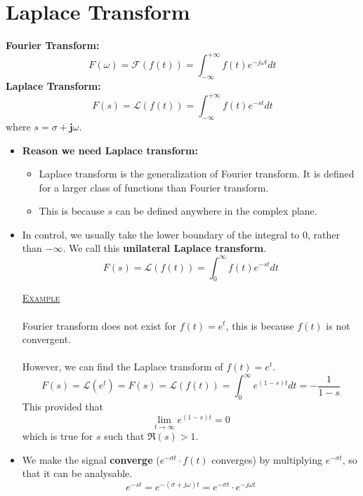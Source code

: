 \documentclass[12pt,a4paper]{article}
\begin{document}
\section{Laplace Transform}
\textbf{Fourier Transform:}
\[ F(\omega) = \mathcal{F} (f(t)) = \int_{-\infty}^{+\infty} f(t) e^{-j\omega t} dt \]
\textbf{Laplace Transform:}
\[ F(s) = \mathcal{L} (f(t)) = \int_{-\infty}^{+\infty} f(t) e^{-st} dt \]
\quad where $s = \sigma + \mathbf{j} \omega$.
\ \\
\begin{itemize}
\item \textbf{Reason we need Laplace transform:}
\begin{itemize}
\item  Laplace transform is the generalization of Fourier transform. It is defined for a larger class of functions than Fourier transform.
\item This is because $s$ can be defined anywhere in the complex plane.
\end{itemize}
 \item In control, we usually take the lower boundary of the integral to 0, rather than $-\infty$. We call this \textbf{unilateral Laplace transform}. \[ F(s) = \mathcal{L} (f(t)) = \int_{0}^{\infty} f(t) e^{-st} dt \]

\begin{tcolorbox}[breakable]%
\underline{\textsc{Example}}\ \\ \\
  Fourier transform does not exist for $f(t)=e^{t}$, this is because $f(t)$ is not convergent.\\\\
 However, we can find the Laplace transform of  $f(t)=e^{t}$. \[ F(s) = \mathcal{L} (e^{t}) = F(s) = \mathcal{L} (f(t)) = \int_{0}^{\infty} e^{(1-s)t}  dt  = -\frac{1}{1-s} \] This provided that \[ \lim_{t \to \infty} e^{(1-s)t} = 0 \] which is true for $s$ such that $\Re(s)>1$.
 \end{tcolorbox}

\item We make the signal \textbf{converge} ($e^{-\sigma t} \cdot f(t)$ converges) by multiplying $e^{-\sigma t}$, so that it can be analysable.
\[e^{-st} = e^{-(\sigma + j\omega)t} = e^{-\sigma t}\cdot e^{-j\omega t} \]
\end{itemize}
\end{document}
